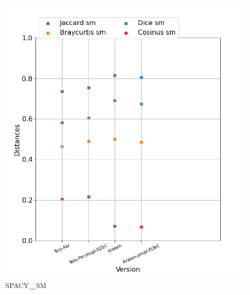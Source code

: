 \begin{figure}[H]
\begin{minipage}{6cm}
\begin{subfigure}{0.89\textwidth}
  \label{fig: }
  \end{subfigure}
  \end{minipage}
  \begin{minipage}{6cm}
  \begin{subfigure}{0.89\textwidth}
  \includegraphics[width=.89\textwidth]{IMAGES/ELTeC_DISTANCES_spaCy3.5.1/DE-QUEIROS-CRIME-graph-dist-spaCy3.5.1-sm.png} 
  \caption{\textsc{spacy\_sm}}
  \label{fig:}
  \end{subfigure}
    \end{minipage}
  \begin{minipage}{6cm}
  \begin{subfigure}{0.89\textwidth}

\end{subfigure}
\end{minipage}
\end{figure}
